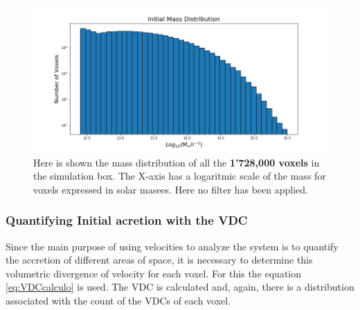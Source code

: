 \begin{figure}[h]
    \centering
    \includegraphics[width=\linewidth]{MD_0.png}
    \caption{Here is shown the mass distribution of all the \textbf{1'728,000 voxels} in the simulation box. The X-axis has a logaritmic scale of the mass for voxels expressed in solar masees. Here no filter has been applied.}
    \label{fig:InMassDistribution}
\end{figure}




  

\subsubsection{Quantifying Initial acretion with the VDC} \label{sec:VDCquantifyingResults}
Since the main purpose of using velocities to analyze the system is to quantify the accretion of different areas of space, it is necessary to determine this volumetric divergence of velocity for each voxel. For this the equation \ref{eq:VDCcalculo} is used. The VDC is calculated and, again, there is a distribution associated with the count of the VDCs of each voxel.

